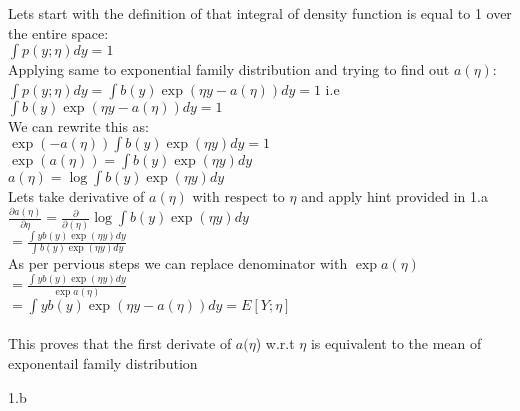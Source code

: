 \begin{answer}
\LARGE
Lets start with the definition of that integral of density function is equal to 1 over the entire space:
\\
$ \int p (y; \eta)dy = 1 $
\\
Applying same to exponential family distribution and trying to find out $ a (\eta) $:
\\ 
$ \int p(y; \eta) dy = \int  b(y)\exp(\eta y - a(\eta)) dy = 1 $ i.e
\\  
$  \int  b(y)\exp(\eta y - a(\eta)) dy = 1 $
\\ We can rewrite this as: \\
$ \exp(-a(\eta)) \int b(y)\exp(\eta y) dy = 1 $
\\ 
$ \exp(a(\eta)) = \int b(y)\exp(\eta y) dy $ 
\\ 
$ a(\eta) = \log  \int b(y)\exp(\eta y) dy $ 
\\ Lets take derivative of $a(\eta)$ with respect to $\eta$ and apply hint provided in 1.a
\\ 
$ \frac {\partial a(\eta)}{ \partial \eta}  = \frac{\partial}{\partial (\eta) } \log  \int b(y)\exp(\eta y) dy $
\\
$= \frac{\int yb(y) \exp (\eta y) dy} {\int b(y) \exp (\eta y) dy} $
\\ As per pervious steps we can replace denominator with $ \exp a(\eta) $ 
\\
$=  \frac{\int yb(y) \exp (\eta y) dy} { \exp a(\eta)} $
\\
$=  \int  y b(y)\exp(\eta y - a(\eta)) dy = E [Y;\eta] $
\\ \\ This proves that the first derivate of $a(\eta$) w.r.t $\eta$ is equivalent to the mean of exponentail family distribution

\end{answer}
\clearpage

\LARGE
1.b
\normalsize

